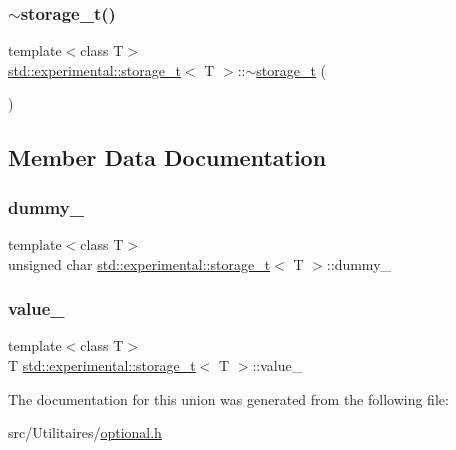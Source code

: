 \subsubsection{\texorpdfstring{$\sim$storage\+\_\+t()}{~storage\_t()}}
{\footnotesize\ttfamily template$<$class T$>$ \\
\mbox{\hyperlink{unionstd_1_1experimental_1_1storage__t}{std\+::experimental\+::storage\+\_\+t}}$<$ T $>$\+::$\sim$\mbox{\hyperlink{unionstd_1_1experimental_1_1storage__t}{storage\+\_\+t}} (\begin{DoxyParamCaption}{ }\end{DoxyParamCaption})\hspace{0.3cm}{\ttfamily [inline]}}



\subsection{Member Data Documentation}
\mbox{\label{unionstd_1_1experimental_1_1storage__t_a66c46e8a91805a1495127fa280a3f58a}} 
\subsubsection{\texorpdfstring{dummy\+\_\+}{dummy\_}}
{\footnotesize\ttfamily template$<$class T$>$ \\
unsigned char \mbox{\hyperlink{unionstd_1_1experimental_1_1storage__t}{std\+::experimental\+::storage\+\_\+t}}$<$ T $>$\+::dummy\+\_\+}

\mbox{\label{unionstd_1_1experimental_1_1storage__t_afc411a630487df07bf6278ebbef1ebb7}} 
\subsubsection{\texorpdfstring{value\+\_\+}{value\_}}
{\footnotesize\ttfamily template$<$class T$>$ \\
T \mbox{\hyperlink{unionstd_1_1experimental_1_1storage__t}{std\+::experimental\+::storage\+\_\+t}}$<$ T $>$\+::value\+\_\+}



The documentation for this union was generated from the following file\+:\begin{DoxyCompactItemize}
\item 
src/\+Utilitaires/\mbox{\hyperlink{optional_8h}{optional.\+h}}\end{DoxyCompactItemize}

